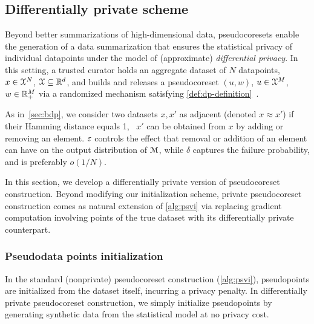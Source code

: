 \subsection{Differentially private scheme}
\label{sec:dp-pseudocoresets}

Beyond better summarizations of high-dimensional data, pseudocoresets enable the 
generation of a data summarization that ensures the statistical privacy of individual datapoints under the model of (approximate) \emph{differential privacy}. In this setting, a trusted
 curator holds an aggregate dataset of $N$ datapoints, $x\in\mathcal{X}^N$, $\mathcal{X}\subseteq \mathbb{R}^d$, and 
builds and releases a pseudocoreset $(u, w)$, $u\in\mathcal{X}^M$, $w\in\mathbb{R}_+^M$ via
a randomized mechanism satisfying \cref{def:dp-definition}~\citep{dwork06,ourdata}.

As in~\cref{sec:bdp}, we consider two datasets $x, x'$ as adjacent (denoted 
$ x \approx x' $) if their Hamming distance equals 1, \ie~$ x' $ can be obtained from $ x $ by adding or removing an
element.  $ \varepsilon $ controls the effect that removal or addition of an element
can have on the output distribution of $\mathcal{M}$, while %
$ \delta $
captures the failure probability, 
and is preferably $ o(1/N)$. 

In this section, we develop a differentially private version of pseudocoreset construction.
Beyond modifying our initialization scheme, private pseudocoreset
construction comes as natural extension of \cref{alg:psvi}
 via replacing gradient computation involving points of the
true dataset with its differentially private counterpart. 


\subsubsection{Pseudodata points initialization}
\label{sec:pseudo-points-initilization}

In the standard (nonprivate) pseudocoreset construction (\cref{alg:psvi}), pseudopoints are initialized from the dataset itself,
incurring a privacy penalty. In differentially private pseudocoreset construction,
we simply initialize pseudopoints by generating synthetic data from the statistical model
at no privacy cost.



